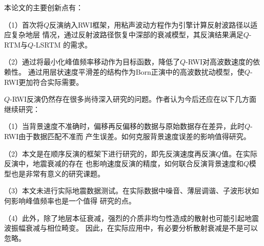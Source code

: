 
本论文的主要创新点有：

（1）首次将$Q$反演纳入RWI框架，用粘声波动方程作为引擎计算反射波路径以适应复杂地层
情况，通过反射波路径恢复中深部的衰减模型，其反演结果满足$Q$-RTM与$Q$-LSRTM
的需求。

（2）通过将最小化峰值频率移动作为目标函数，降低了$Q$-RWI对高波数速度的依赖性。
通过用层状速度平滑差的结构作为Born正演中的高波数扰动模型，使$Q$-RWI更加符合实际需要。


$Q$-RWI反演仍然存在很多尚待深入研究的问题。作者认为今后还应在以下几方面
继续研究：

（1）当背景速度不准确时，偏移再反偏移的数据与原始数据存在差异，此时$Q$-RWI由于数据匹配不准而
产生误差。如何克服背景速度误差的影响值得研究。

（2）本文是在顺序反演的框架下进行研究的，即先反演速度再反演$Q$值。在实际反演中，地震衰减的存在
也影响速度反演的精度，如何联合反演背景速度和$Q$模型也是非常有意义的研究课题。

（3）本文未进行实际地震数据测试。在实际数据中噪音、薄层调谐、子波形状如何影响峰值频率也是一个值得
研究的点。

（4）此外，除了地层本征衰减，强烈的介质非均匀性造成的散射也可能引起地震波振幅衰减与相位畸变。
因此，在实际应用中，有必要分析散射衰减是不是可以忽略。
